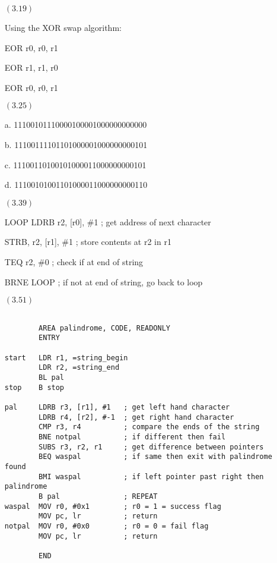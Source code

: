 \documentclass[letterpaper,10pt,titlepage]{article}
\begin{document}
\begin{enumerate}
\item[$(3.19)$]   
  
  Using the XOR swap algorithm:
  
  EOR r0, r0, r1
  
  EOR r1, r1, r0
  
  EOR r0, r0, r1

\item[$(3.25)$]
  
  a. 11100101110000100001000000000000
  
  b. 11100111101101000001000000000101
  
  c. 11100110100101000011000000000101
  
  d. 11100101001101000011000000000110
  
\item[$(3.39)$]

LOOP	LDRB r2, [r0], \#1	; get address of next character

		STRB, r2, [r1], \#1	; store contents at r2 in r1

		TEQ r2, \#0			; check if at end of string

		BRNE LOOP			; if not at end of string, go back to loop
		
  
\item[$(3.51)$]
  
\begin{lstlisting}

		AREA palindrome, CODE, READONLY
		ENTRY
							
start	LDR r1, =string_begin		
		LDR r2, =string_end
		BL pal				
stop	B stop

pal		LDRB r3, [r1], #1	; get left hand character
		LDRB r4, [r2], #-1	; get right hand character
		CMP r3, r4			; compare the ends of the string
		BNE notpal			; if different then fail
		SUBS r3, r2, r1		; get difference between pointers
		BEQ waspal			; if same then exit with palindrome found
		BMI waspal			; if left pointer past right then palindrome
		B pal				; REPEAT
waspal	MOV r0, #0x1		; r0 = 1 = success flag
		MOV pc, lr			; return
notpal	MOV r0, #0x0		; r0 = 0 = fail flag
		MOV pc, lr			; return
		
		END

\end{lstlisting}
  
\end{enumerate}
\end{document}
